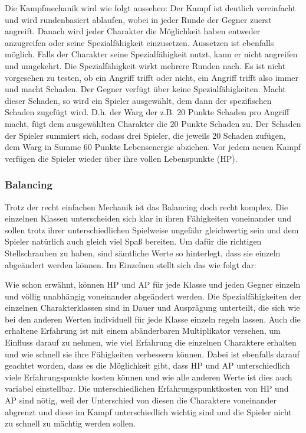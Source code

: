 Die Kampfmechanik wird wie folgt aussehen: Der Kampf ist deutlich vereinfacht und wird rundenbasiert ablaufen, wobei in jeder Runde der Gegner zuerst angreift. Danach wird jeder Charakter die Möglichkeit haben entweder anzugreifen oder seine Spezialfähigkeit einzusetzen. Aussetzen ist ebenfalls möglich. Falls der Charakter seine Spezialfähigkeit nutzt, kann er nicht angreifen und umgekehrt. Die Spezialfähigkeit wirkt mehrere Runden nach. Es ist nicht vorgesehen zu testen, ob ein Angriff trifft oder nicht, ein Angriff trifft also immer und macht Schaden. Der Gegner verfügt über keine Spezialfähigkeiten. Macht dieser Schaden, so wird ein Spieler ausgewählt, dem dann der spezifischen Schaden zugefügt wird. D.h. der Warg der z.B. 20 Punkte Schaden pro Angriff macht, fügt dem ausgewählten Charakter die 20 Punkte Schaden zu. Der Schaden der Spieler summiert sich, sodass drei Spieler, die jeweils 20 Schaden zufügen, dem Warg in Summe 60 Punkte Lebensenergie abziehen. Vor jedem neuen Kampf verfügen die Spieler wieder über ihre vollen Lebenspunkte (HP).

\subsubsection{Balancing} Trotz der recht einfachen Mechanik ist das Balancing doch recht komplex. Die einzelnen Klassen unterscheiden sich klar in ihren Fähigkeiten voneinander und sollen trotz ihrer unterschiedlichen Spielweise ungefähr gleichwertig sein und dem Spieler natürlich auch gleich viel Spaß bereiten. Um dafür die richtigen Stellschrauben zu haben, sind sämtliche Werte so hinterlegt, dass sie einzeln abgeändert werden können. Im Einzelnen stellt sich das wie folgt dar: 

Wie schon erwähnt, können HP und AP für jede Klasse und jeden Gegner einzeln und völlig unabhängig voneinander abgeändert werden. Die Spezialfähigkeiten der einzelnen Charakterklassen sind in Dauer und Ausprägung unterteilt, die sich wie bei den anderen Werten individuell für jede Klasse einzeln regeln lassen. Auch die erhaltene Erfahrung ist mit einem abänderbaren Multiplikator versehen, um Einfluss darauf zu nehmen, wie viel Erfahrung die einzelnen Charaktere erhalten und wie schnell sie ihre Fähigkeiten verbessern können. Dabei ist ebenfalls darauf geachtet worden, dass es die Möglichkeit gibt, dass HP und AP unterschiedlich viele Erfahrungspunkte kosten können und wie alle anderen Werte ist dies auch variabel einstellbar. Die unterschiedlichen Erfahrungspunktkosten von HP und AP sind nötig, weil der Unterschied von diesen die Charaktere voneinander abgrenzt und diese im Kampf unterschiedlich wichtig sind und die Spieler nicht zu schnell zu mächtig werden sollen.

